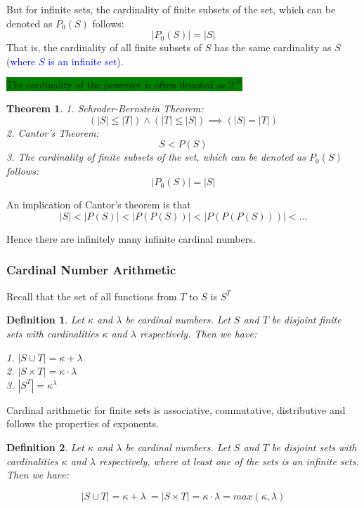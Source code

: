 \documentclass[12pt]{article}
\newcommand{\mybox}[2][black]{\colorbox{#1}{#2}}
\newtheorem{theorem}{Theorem}
\newtheorem{definition}{Definition}
\begin{document}
But for infinite sets, the cardinality of finite subsets of the set, which can be denoted as $P_{0} (S)$ follows:
\[ |P_{0}(S)| = |S| \] That is, the cardinality of all finite subsets of $S$ has the same cardinality as $S$(\textcolor{blue}{where $S$ is an infinite set}).

\mybox[green]{The cardinality of the powerset is often denoted as $2^{|S|}$}


\begin{theorem}
1. Schroder-Bernstein Theorem: \[ (|S| \leq |T|) \land (|T| \leq |S|) \implies (|S| = |T|) \]
2. Cantor's Theorem: \[S < P(S)\]
3. The cardinality of finite subsets of the set, which can be denoted as $P_{0} (S)$ follows:
\[ |P_{0}(S)| = |S| \]
\end{theorem}

An implication of Cantor's theorem is that 
\[|S| < |P(S)| < |P(P(S))| < |P(P(P(S)))| < \ldots \]

Hence there are infinitely many infinite cardinal numbers.


\subsubsection{Cardinal Number Arithmetic}

Recall that the set of all functions from $T$ to $S$ is $S^T$

\begin{definition}
Let $\kappa$ and $\lambda$ be cardinal numbers. Let $S$ and $T$ be disjoint finite sets with cardinalities $\kappa$ and $\lambda$ respectively. Then we have:

1. $|S \cup T| = \kappa + \lambda$\\
2. $|S \times T| = \kappa \cdot \lambda$\\
3. $|S^{T}| = \kappa^{\lambda}$\\
\end{definition}

Cardinal arithmetic for finite sets is associative, commutative, distributive and follows the properties of exponents.

\begin{definition}
Let $\kappa$ and $\lambda$ be cardinal numbers. Let $S$ and $T$ be disjoint sets with cardinalities $\kappa$ and $\lambda$ respectively, where at least one of the sets is an infinite sets. Then we have:

\[|S \cup T| = \kappa + \lambda\ = |S \times T| = \kappa \cdot \lambda = max(\kappa, \lambda)\]
\end{definition}
\end{document}
